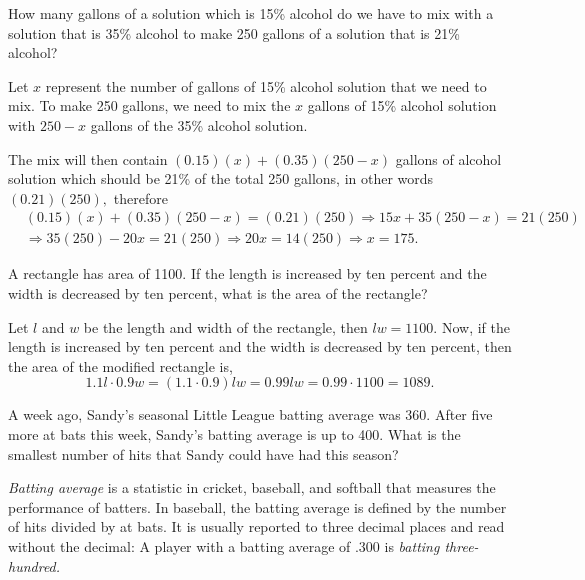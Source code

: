 \documentclass{article}
\begin{document}
\begin{example}
    How many gallons of a solution which is 15\% alcohol do we have to mix with a solution that is 35\% alcohol
    to make 250 gallons of a solution that is 21\% alcohol?
\end{example}

\begin{soln}
    Let $x$ represent the number of gallons of 15\% alcohol solution that we need to mix.
    To make 250 gallons, we need to mix the $x$ gallons of 15\% alcohol solution with $250-x$ gallons of the 35\% alcohol solution.
    
    The mix will then contain $(0.15)(x) + (0.35)(250-x)$ gallons of alcohol solution which should be 21\% of the total 250 gallons,
    in other words $(0.21)(250),$ therefore
    \[
        \begin{aligned}
            &(0.15)(x) + (0.35)(250-x) = (0.21)(250) \Rightarrow 15x + 35(250-x) = 21(250)\\
            &\Rightarrow 35(250) - 20x = 21(250) \Rightarrow 20 x = 14(250) \Rightarrow x = \boxed{175}.
        \end{aligned}
    \]
\end{soln}

\begin{example}
    A rectangle has area of 1100. If the length is increased by ten percent and the width is decreased by ten percent, what is the area of the rectangle?
\end{example}

\begin{soln}
    Let $l$ and $w$ be the length and width of the rectangle, then $lw = 1100.$
    Now, if the length is increased by ten percent and the width is decreased by ten percent, then the area of the modified rectangle is,
    \[
        1.1 l \cdot 0.9 w = (1.1 \cdot 0.9)lw = 0.99 lw = 0.99 \cdot 1100 = \boxed{1089.}
    \]
\end{soln}

\begin{example}
    A week ago, Sandy's seasonal Little League batting average was 360.
    After five more at bats this week, Sandy's batting average is up to 400.
    What is the smallest number of hits that Sandy could have had this season?
\end{example}

\begin{remark*}
    \textit{Batting average} is a statistic in cricket, baseball, and softball that measures the performance of batters.
    In baseball, the batting average is defined by the number of hits divided by at bats.
    It is usually reported to three decimal places and read without the decimal:
    A player with a batting average of $.300$ is \textit{batting three-hundred.}
\end{remark*}
\end{document}
